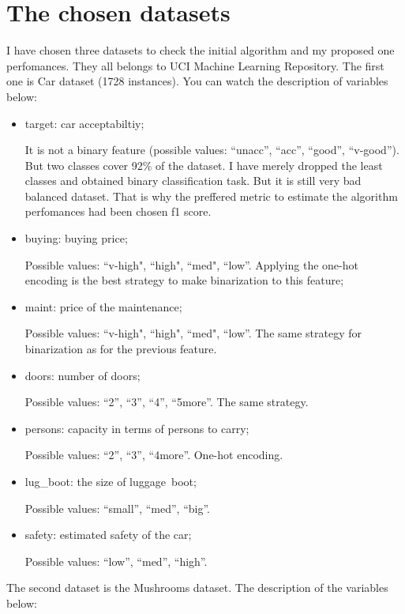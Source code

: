 \documentclass[12pt]{report}
\begin{document}
\section{The chosen datasets}
I have chosen three datasets to check the initial algorithm and my proposed one perfomances. They all belongs to UCI Machine Learning Repository. The first one is Car dataset (1728 instances). You can watch the description of variables below:
\begin{itemize}
  \item target: car acceptabiltiy;
  \par It is not a binary feature (possible values: ``unacc'', ``acc'', ``good'', ``v-good''). But two classes cover 92\% of the dataset. I have merely dropped the least classes and obtained binary classification task. But it is still very bad balanced dataset. That is why the preffered metric to estimate the algorithm perfomances had been chosen f1 score.
  \item buying: buying price;
  \par 
  Possible values: ``v-high", ``high", ``med", ``low''. Applying the one-hot encoding is the best strategy to make binarization to this feature;
  \item maint: price of the maintenance;
  \par Possible values: ``v-high", ``high", ``med", ``low''. The same strategy for binarization as for the previous feature.
  \item doors: number of doors;
  \par Possible values: ``2'', ``3'', ``4'', ``5more''. The same strategy.
  \item persons: capacity in terms of persons to carry;
  \par Possible values: ``2'', ``3'', ``4more''. One-hot encoding.
  \item lug\_boot: the size of luggage\ boot;
  \par Possible values: ``small'', ``med'', ``big''.
  \item safety: estimated safety of the car;
  \par Possible values: ``low'', ``med'', ``high''.
\end{itemize}
The second dataset is the Mushrooms dataset. The description of the variables below:
\end{document}
